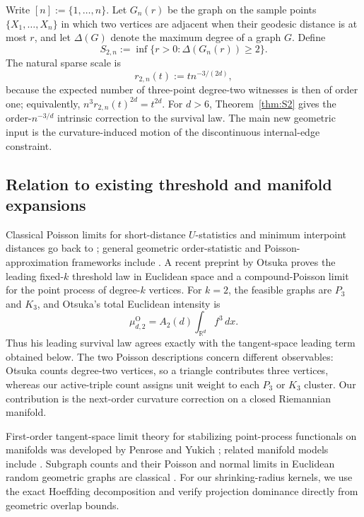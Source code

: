 \documentclass[11pt]{article}
\theoremstyle{remark}
\numberwithin{equation}{section}
\begin{document}
Write $[n]:=\{1,\ldots,n\}$.  Let $G_n(r)$ be the graph on the sample points
$\{X_1,\ldots,X_n\}$ in which two vertices are adjacent when their geodesic
distance is at most $r$, and let $\Delta(G)$ denote the maximum degree of a
graph $G$.  Define
\[
S_{2,n}:=\inf\{r>0:\Delta(G_n(r))\ge2\}.
\]
The natural sparse scale is
\[
r_{2,n}(t):=t n^{-3/(2d)},
\]
because the expected number of three-point degree-two witnesses is then of
order one; equivalently, $n^3r_{2,n}(t)^{2d}=t^{2d}$.  For $d>6$,
Theorem~\ref{thm:S2} gives the order-$n^{-3/d}$ intrinsic correction to the
survival law.  The main new geometric input is the curvature-induced motion
of the discontinuous internal-edge constraint.

\subsection{Relation to existing threshold and manifold expansions}
\label{subsec:relation-previous-work}

Classical Poisson limits for short-distance $U$-statistics and minimum
interpoint distances go back to
\cite{SilvermanBrown1978,KanagawaMochizukiTanaka1992}; general geometric
order-statistic and Poisson-approximation frameworks include
\cite{SchulteThale2012,DecreusefondSchulteThale2016}.
A recent preprint by Otsuka \cite{Otsuka2026} proves the leading fixed-$k$
threshold law in Euclidean space and a compound-Poisson limit for the point
process of degree-$k$ vertices.
For $k=2$, the feasible graphs are $P_3$
and $K_3$, and Otsuka's total Euclidean intensity is
\[
\mu^{\mathrm O}_{d,2}
=
A_2(d)\int_{\mathbb R^d}f^3\,dx.
\]
Thus his leading survival law agrees exactly with the tangent-space leading
term obtained below.  The two Poisson descriptions concern different
observables: Otsuka counts degree-two vertices, so a triangle contributes
three vertices, whereas our active-triple count assigns unit weight to each
$P_3$ or $K_3$ cluster.  Our contribution is the next-order curvature
correction on a closed Riemannian manifold.

First-order tangent-space limit theory for stabilizing point-process
functionals on manifolds was developed by Penrose and Yukich
\cite{PenroseYukich2013}; related manifold models include
\cite{BobrowskiOliveira2019,AuffingerLerarioLundberg2021,LerarioMulas2021}.
Subgraph counts and their Poisson and normal limits in Euclidean random
geometric graphs are classical \cite[Chapter~3]{Penrose2003}.
For our shrinking-radius kernels, we use the exact Hoeffding decomposition
\cite[Chapter~5]{Serfling1980} and verify projection dominance directly from
geometric overlap bounds.
\end{document}
